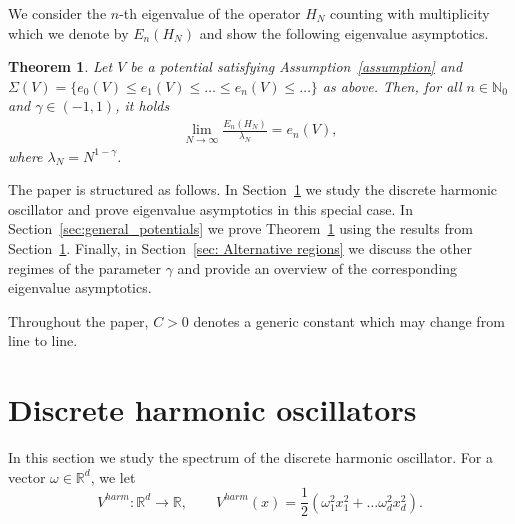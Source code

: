 \documentclass[12pt, reqno]{amsart}
\newtheorem{theorem}{Theorem}[section]
\theoremstyle{definition}
\numberwithin{equation}{section}
\newcommand{\R}{{\mathbb R}}
\begin{document}
We consider the $n$-th eigenvalue of the operator $H_N$ counting with multiplicity which we denote by $E_n(H_N)$ and show the following eigenvalue asymptotics.

\begin{theorem}\label{thm:main}
    Let $V$ be a potential satisfying Assumption~\ref{assumption} and $\Sigma(V)=\{e_0(V)\leq e_1(V)\leq\ldots\leq e_n(V)\leq \ldots\}$ as above.  Then, for all $n\in \mathbb{N}_0$ and $\gamma\in (-1,1)$, it holds
    \begin{align*}
        \lim_{N\to \infty} \frac{E_n(H_N)}{\lambda_N} = e_n(V),
    \end{align*}
    where $\lambda_N=N^{1-\gamma}$.
\end{theorem}


The paper is structured as follows. In Section~\ref{sec: Discrete harmonic oscillators} we study the discrete harmonic oscillator and prove eigenvalue asymptotics in this special case. In Section~\ref{sec:general_potentials} we prove Theorem~\ref{thm:main} using the results from Section~\ref{sec: Discrete harmonic oscillators}. Finally, in Section~\ref{sec: Alternative regions} we discuss the other regimes of the parameter $\gamma$ and provide an overview of the corresponding eigenvalue asymptotics.

Throughout the paper, $C>0$ denotes a generic constant which may change from line to line.

\section{Discrete harmonic oscillators}\label{sec: Discrete harmonic oscillators}

In this section we study the spectrum of the discrete harmonic oscillator. For a vector $\omega\in \R^d$, we let $$V^{harm}:\R^d\to \R,\qquad V^{harm}(x)= \frac{1}2(\omega_1^2x_1^2+\ldots \omega_d^2x_d^2).$$
\end{document}
